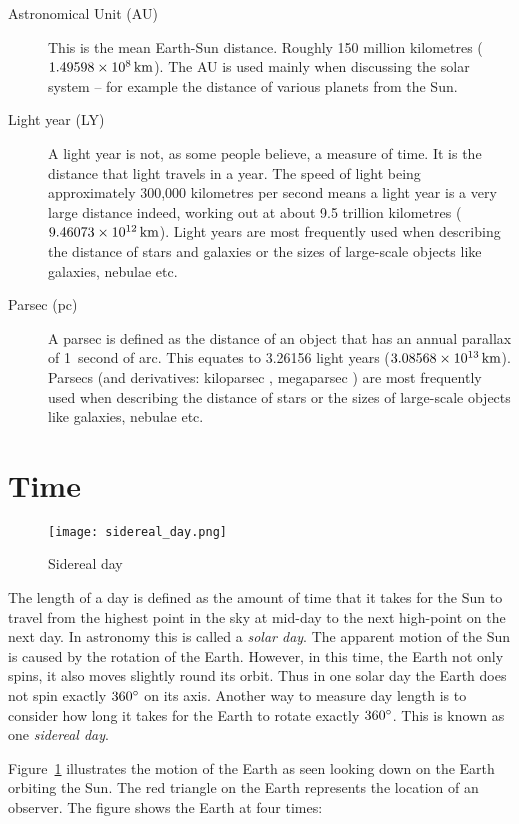 \begin{description}
\item[Astronomical Unit (AU)] This is the mean Earth-Sun
  distance. Roughly 150 million kilometres
  ($1.49598 \times 10^8\,\mathrm{km}$). The AU is used mainly when
  discussing the solar system -- for example the distance of various
  planets from the Sun.
\item[Light year (LY)] A light year is not, as some people believe, a
  measure of time. It is the distance that light travels in a
  year. The speed of light being approximately 300,000 kilometres per
  second means a light year is a very large distance indeed, working
  out at about 9.5 trillion kilometres
  ($9.46073\times10^{12}\,\mathrm{km}$). Light years are most frequently used
  when describing the distance of stars and galaxies or the sizes of
  large-scale objects like galaxies, nebulae etc.
\item[Parsec (pc)] A parsec is defined as the distance of an object
  that has an annual parallax of 1~second of arc. This equates to
  3.26156 light years ($3.08568\times10^{13}\,\mathrm{km}$). Parsecs (and derivatives: kiloparsec \kpc, megaparsec \Mpc) are most
  frequently used when describing the distance of stars or the sizes
  of large-scale objects like galaxies, nebulae etc.
\end{description}

\section{Time}
\label{sec:Concepts:Time}

\begin{figure}[ht]
\centering\texttt{[image: sidereal\_day.png]}
\caption{Sidereal day}
\label{fig:SiderealDay}
\end{figure}

The length of a day is defined as the amount of time that it takes for
the Sun to travel from the highest point in the sky at mid-day to the
next high-point on the next day. In astronomy this is called a
\emph{solar day}. The apparent motion of the Sun is caused by the
rotation of the Earth. However, in this time, the Earth not only spins,
it also moves slightly round its orbit. Thus in one solar day the Earth
does not spin exactly $360\degree$ on its axis. Another way to measure day
length is to consider how long it takes for the Earth to rotate exactly
$360\degree$. This is known as one \emph{sidereal day}.

Figure~\ref{fig:SiderealDay} illustrates the motion of the Earth as
seen looking down on the Earth orbiting the Sun. The red triangle on the
Earth represents the location of an observer. The figure shows the Earth
at four times:

